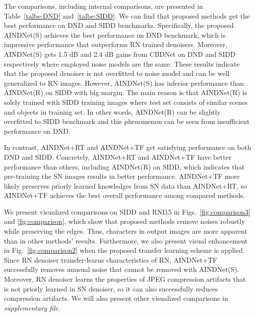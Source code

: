 \documentclass[10pt,twocolumn,letterpaper]{article}
\begin{document}
The comparisons, including internal comparisons, are presented in Table~\ref{talbe:DND} and~\ref{talbe:SIDD}.
We can find that proposed methods get the best performance on DND and SIDD benchmarks.
Specifically, the proposed AINDNet(S) achieves the best performance on DND benchmark, 
which is impressive performance that outperforms RN trained denoisers. 
Moreover, AINDNet(S) gets 1.5 dB and 2.4 dB gains from CBDNet on DND and SIDD respectively where employed noise models are the same.
These results indicate that the proposed denoiser is not overfitted to noise model and can be well generalized to RN images.
However, AINDNet(S) has inferior performance than AINDNet(R) on SIDD with big margin. 
The main reason is that AINDNet(R) is solely trained with SIDD training images where test set consists of similar scenes and objects in training set.
In other words, AINDNet(R) can be slightly overfitted to SIDD benchmark and this phenomenon can be seen from insufficient performance on DND.  

In contrast, AINDNet+RT and AINDNet+TF get satisfying performance on both DND and SIDD.
Concretely, AINDNet+RT and AINDNet+TF have better performance than others, including AINDNet(R) on SIDD, 
which indicates that pre-training the SN images results in better performance.
AINDNet+TF more likely preserves priorly learned knowledges from SN data than AINDNet+RT, so AINDNet+TF achieves the best overall performance among compared methods.

We present visualized comparisons on SIDD and RNI15 in Figs.~\ref{fig:comparison3} and \ref{fig:comparison}, which show that proposed methods remove noises robustly while preserving the edges. 
Thus, characters in output images are more apparent than in other methods' results.
Furthermore, we also present visual enhancement in Fig.~\ref{fig:comparison2} when the proposed transfer learning scheme is applied.
Since RN denoiser transfer-learns characteristics of RN, AINDNet+TF successfully removes unusual noise that cannot be removed with AINDNet(S).
Moreover, RN denoiser learns the properties of JPEG compression artifacts that is not priorly learned in SN denoiser, so it can also successfully reduces compression artifacts. 
We will also present other visualized comparisons in \textit{supplementary file}.
\end{document}
